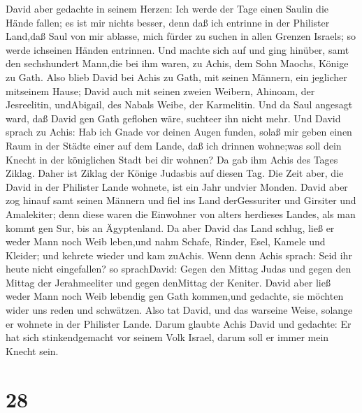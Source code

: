  David aber gedachte in seinem Herzen: Ich werde der Tage
einen Saulin die Hände fallen; es ist mir nichts besser, denn daß ich
entrinne in der Philister Land,daß Saul von mir ablasse, mich fürder zu
suchen in allen Grenzen Israels; so werde ichseinen Händen entrinnen.
 Und machte sich auf und ging hinüber, samt den sechshundert
Mann,die bei ihm waren, zu Achis, dem Sohn Maochs, Könige zu Gath.
 Also blieb David bei Achis zu Gath, mit seinen Männern, ein
jeglicher mitseinem Hause; David auch mit seinen zweien Weibern,
Ahinoam, der Jesreelitin, undAbigail, des Nabals Weibe, der Karmelitin.
 Und da Saul angesagt ward, daß David gen Gath geflohen
wäre, suchteer ihn nicht mehr.  Und David sprach zu Achis:
Hab ich Gnade vor deinen Augen funden, solaß mir geben einen Raum in der
Städte einer auf dem Lande, daß ich drinnen wohne;was soll dein Knecht
in der königlichen Stadt bei dir wohnen?  Da gab ihm Achis
des Tages Ziklag. Daher ist Ziklag der Könige Judasbis auf diesen Tag.
 Die Zeit aber, die David in der Philister Lande wohnete,
ist ein Jahr undvier Monden.  David aber zog hinauf samt
seinen Männern und fiel ins Land derGessuriter und Girsiter und
Amalekiter; denn diese waren die Einwohner von alters herdieses Landes,
als man kommt gen Sur, bis an Ägyptenland.  Da aber David
das Land schlug, ließ er weder Mann noch Weib leben,und nahm Schafe,
Rinder, Esel, Kamele und Kleider; und kehrete wieder und kam zuAchis.
 Wenn denn Achis sprach: Seid ihr heute nicht eingefallen?
so sprachDavid: Gegen den Mittag Judas und gegen den Mittag der
Jerahmeeliter und gegen denMittag der Keniter.  David aber
ließ weder Mann noch Weib lebendig gen Gath kommen,und gedachte, sie
möchten wider uns reden und schwätzen. Also tat David, und das warseine
Weise, solange er wohnete in der Philister Lande.  Darum
glaubte Achis David und gedachte: Er hat sich stinkendgemacht vor seinem
Volk Israel, darum soll er immer mein Knecht sein.

\hypertarget{section-27}{%
\section{28}\label{section-27}}

